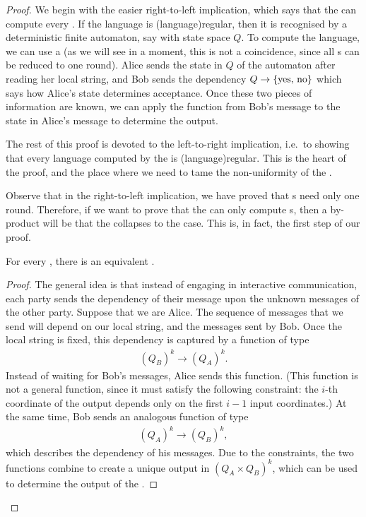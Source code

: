 \begin{proof}
  We begin with the easier right-to-left implication, which says that the  can compute every . If the language is  \kl(language){regular}, then it  is recognised by a deterministic finite automaton, say  with state space $Q$. To compute the language, we can use a   (as we will see in a moment, this is not a coincidence, since all s can be reduced to one round). Alice sends the state in $Q$ of the automaton after reading her local string, and Bob sends the dependency $Q \to \{\text{yes, no}\}$ which says how Alice's state determines acceptance. Once these two pieces of information are known, we can apply the function from Bob's message to the state in Alice's message to determine the output.

  The rest of this proof is devoted to the left-to-right implication, i.e.~to showing that every language computed by the  is \kl(language){regular}. This is the heart of the proof, and the place where we need to tame the non-uniformity of the . 
  
  Observe that in the right-to-left implication, we have proved that s need only one round. Therefore, if we want to  prove that the  can only compute s, then a by-product will be that the  collapses to the  case.  This is, in fact, the first step of our proof. 
  \begin{lemma}\label{lem:one-round-reduction-boolean}
    For every , there is an equivalent . 
  \end{lemma}
  \begin{proof}
    The general idea is that instead of engaging in interactive communication, each party sends the dependency of their message upon the unknown messages of the other party. Suppose that we are  Alice. The sequence of messages that we send will depend on our local string, and  the messages sent by Bob. Once the local string is fixed, this dependency is captured by a function of type 
    \begin{align*}
    (Q_B)^k \to (Q_A)^k.
    \end{align*}
    Instead of waiting for Bob's messages, Alice sends this function. (This function is not a general function, since it must satisfy the following  constraint: the $i$-th coordinate of the output depends only on the first $i-1$ input coordinates.) At the same time, Bob sends an analogous function of type 
    \begin{align*}
    (Q_A)^k \to (Q_B)^k,
    \end{align*}
    which describes the dependency of his messages. Due to the  constraints, the two functions combine to create a unique output in $(Q_A \times Q_B)^k$, which can be used to determine the output of the .
  \end{proof}


\end{proof}
